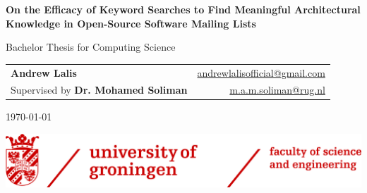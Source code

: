 
\begin{titlepage}
	\headingfont
	\begin{center}
		\LARGE \textbf{On the Efficacy of Keyword Searches to Find Meaningful Architectural Knowledge in Open-Source Software Mailing Lists}
		
		\vspace{0.5cm}
		
		\Large
		Bachelor Thesis for Computing Science
		
		\vspace{2cm}
		
		\begin{tabular}{l r}
			\Large \textbf{Andrew Lalis} & \footnotesize\href{mailto:andrewlalisofficial@gmail.com}{andrewlalisofficial@gmail.com} \\
			\footnotesize Supervised by \normalsize\textbf{Dr. Mohamed Soliman} & \footnotesize\href{mailto:m.a.m.soliman@rug.nl}{m.a.m.soliman@rug.nl}
		\end{tabular}
		
		
		\vspace{1cm}
		
		\small
		\normalfont
		\today
		
		\vfill
				
		\includegraphics[width=\textwidth]{img/rug_fse_logo.png}
	\end{center}

	\normalfont
	\normalsize
\end{titlepage}